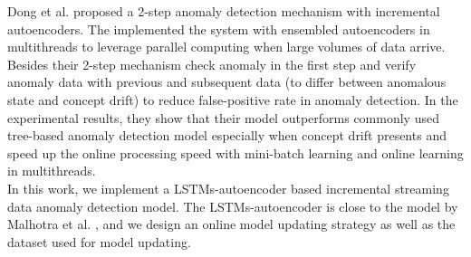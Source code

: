 Dong et al. \cite{threaded} proposed a 2-step anomaly detection mechanism with incremental autoencoders. The implemented the system with ensembled autoencoders in multithreads to leverage parallel computing when large volumes of data arrive. Besides their 2-step mechanism check anomaly in the first step and verify anomaly data with previous and subsequent data (to differ between anomalous state and concept drift) to reduce false-positive rate in anomaly detection. In the experimental results, they show that their model outperforms commonly used tree-based anomaly detection model especially when concept drift presents and speed up the online processing speed with mini-batch learning and online learning in multithreads.\\

In this work, we implement a LSTMs-autoencoder based incremental streaming data anomaly detection model. The LSTMs-autoencoder is close to the model by Malhotra et al. \cite{encdecad}, and we design an online model updating strategy as well as the dataset used for model updating.








